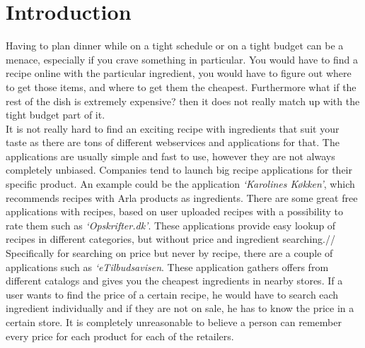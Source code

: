 \section{Introduction}
\label{sec:intro}

Having to plan dinner while on a tight schedule or on a tight budget can be a menace, especially if you crave something in particular. You would have to find a recipe online with the particular ingredient, you would have to figure out where to get those items, and where to get them the cheapest. Furthermore what if the rest of the dish is extremely expensive? then it does not really match up with the tight budget part of it.\\
It is not really hard to find an exciting recipe with ingredients that suit your taste as there are tons of different webservices and applications for that. The applications are usually simple and fast to use, however they are not always completely unbiased. Companies tend to launch big recipe applications for their specific product. An example could be the application \emph{`Karolines Køkken'}\cite{arla}, which recommends recipes with Arla products as ingredients. There are some great free applications with recipes, based on user uploaded recipes with a possibility to rate them such as \emph{`Opskrifter.dk'}\cite{opskrifterdk}. These applications provide easy lookup of recipes in different categories, but without price and ingredient searching.//
Specifically for searching on price but never by recipe, there are a couple of applications such as \emph{`eTilbudsavisen}\cite{etilbudsavisen}. These application gathers offers from different catalogs and gives you the cheapest ingredients in nearby stores. If a user wants to find the price of a certain recipe, he would have to search each ingredient individually and if they are not on sale, he has to know the price in a certain store. It is completely unreasonable to believe a person can remember every price for each product for each of the retailers.
